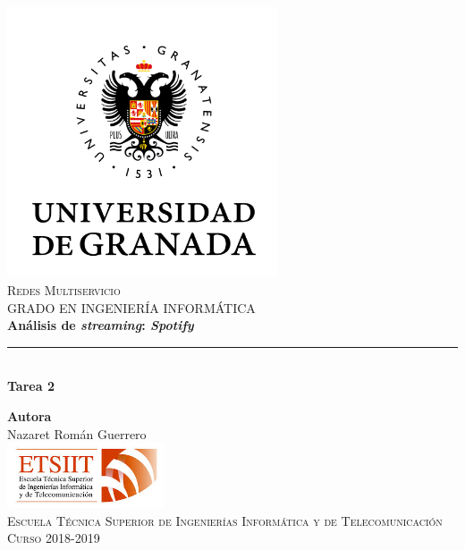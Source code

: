 \documentclass[11pt,a4paper]{article}
\begin{document}
\begin{titlepage}

\begin{minipage}{\textwidth}

\centering
\includegraphics[width=0.6\textwidth]{img/logo.png}\\

\textsc{\Large Redes Multiservicio\\[0.2cm]}
\textsc{GRADO EN INGENIERÍA INFORMÁTICA}\\[1cm]

{\Huge\bfseries Análisis de \textit{streaming}: \textit{Spotify}\\}
\noindent\rule[-1ex]{\textwidth}{3pt}\\[3.5ex]
{\large\bfseries Tarea 2}
\end{minipage}

\vspace{1cm}
\begin{minipage}{\textwidth}
\centering

\textbf{Autora}\\ {Nazaret Román Guerrero}\\[2.5ex]
\includegraphics[width=0.35\textwidth]{img/etsiit.jpeg}\\[0.1cm]
\vspace{0.5cm}
\textsc{Escuela Técnica Superior de Ingenierías Informática y de Telecomunicación}\\
\vspace{0.5cm}
\textsc{Curso 2018-2019}
\end{minipage}
\end{titlepage}
\end{document}
